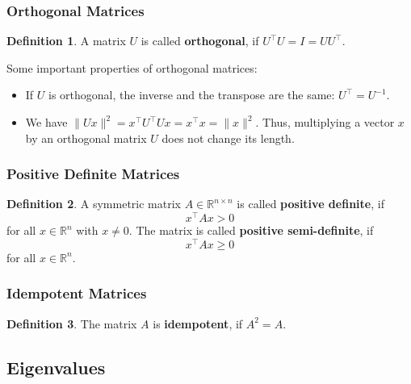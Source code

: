 \documentclass[
  a4paper,
]{article}
\theoremstyle{definition}
\newtheorem{definition}{Definition}[section]
\theoremstyle{definition}
\theoremstyle{definition}
\theoremstyle{definition}
\theoremstyle{remark}
\begin{document}
\subsubsection{Orthogonal Matrices}\label{orthogonal-matrices}

\begin{definition}
A matrix \(U\) is called \textbf{orthogonal}, if \(U^\top U = I = U U^\top\).
\end{definition}

Some important properties of orthogonal matrices:

\begin{itemize}
\item
  If \(U\) is orthogonal, the inverse and the transpose are the same:
  \(U^\top = U^{-1}\).
\item
  We have \(\| U x \|^2 = x^\top U^\top U x = x^\top x = \| x \|^2\).
  Thus, multiplying a vector \(x\) by an orthogonal matrix \(U\) does
  not change its length.
\end{itemize}

\subsubsection{Positive Definite Matrices}\label{positive-definite}

\begin{definition}
A symmetric matrix \(A \in \mathbb{R}^{n\times n}\) is called \textbf{positive definite}, if
\begin{equation*}
  x^\top A x > 0
\end{equation*}
for all \(x \in \mathbb{R}^n\) with \(x\neq 0\). The matrix is called
\textbf{positive semi-definite}, if
\begin{equation*}
  x^\top A x \geq 0
\end{equation*}
for all \(x \in \mathbb{R}^n\).
\end{definition}

\subsubsection{Idempotent Matrices}\label{idempotent}

\begin{definition}
The matrix \(A\) is \textbf{idempotent}, if \(A^2 = A\).
\end{definition}

\subsection{Eigenvalues}\label{eigenvalues}
\end{document}
